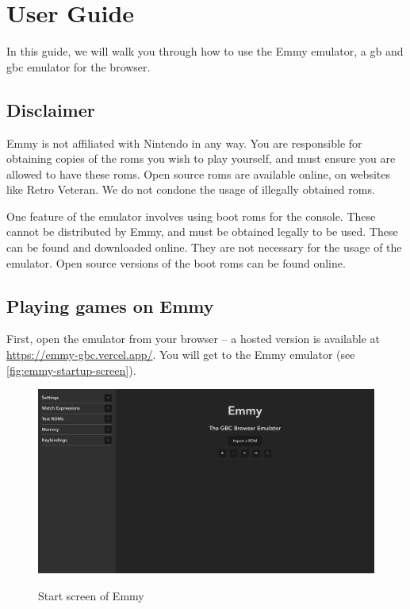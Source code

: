 \chapter{User Guide}

In this guide, we will walk you through how to use the Emmy emulator, a \glsdesc{gb} and \glsdesc{gbc} emulator for the browser.

\section{Disclaimer}

Emmy is not affiliated with Nintendo in any way. You are responsible for obtaining copies of the \glspl{rom} you wish to play yourself, and must ensure you are allowed to have these \glspl{rom}. Open source \glspl{rom} are available online, on websites like Retro Veteran. We do not condone the usage of illegally obtained \glspl{rom}.

One feature of the emulator involves using boot \glspl{rom} for the console. These cannot be distributed by Emmy, and must be obtained legally to be used. These can be found and downloaded online. They are not necessary for the usage of the emulator. Open source versions of the boot \glspl{rom} can be found online.


\section{Playing games on Emmy}

First, open the emulator from your browser -- a hosted version is available at \url{https://emmy-gbc.vercel.app/}. You will get to the Emmy emulator (see \autoref{fig:emmy-startup-screen}).

\begin{figure}[h]
    \centering
    \includegraphics[width=12cm]{images/emmy-startup-screen}\\
    \caption{Start screen of Emmy}
    \label{fig:emmy-startup-screen}
\end{figure}

